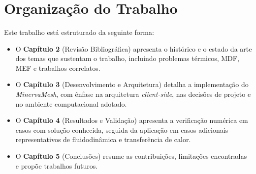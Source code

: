 \section{Organização do Trabalho}

\paragraph{}Este trabalho está estruturado da seguinte forma:
\begin{itemize}
    \item O \textbf{Capítulo 2} (Revisão Bibliográfica) apresenta o histórico e o estado da arte dos temas que sustentam o trabalho, incluindo problemas térmicos, MDF, MEF e trabalhos correlatos.
    \item O \textbf{Capítulo 3} (Desenvolvimento e Arquitetura) detalha a implementação do \textit{MinervaMesh}, com ênfase na arquitetura \textit{client-side}, nas decisões de projeto e no ambiente computacional adotado.
    \item O \textbf{Capítulo 4} (Resultados e Validação) apresenta a verificação numérica em casos com solução conhecida, seguida da aplicação em casos adicionais representativos de fluidodinâmica e transferência de calor.
    \item O \textbf{Capítulo 5} (Conclusões) resume as contribuições, limitações encontradas e propõe trabalhos futuros.
\end{itemize}
